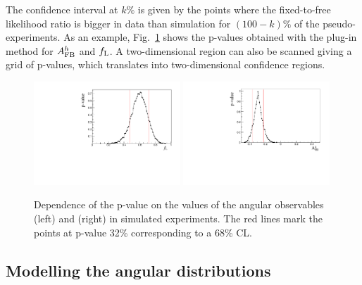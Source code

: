 The confidence interval at $k\%$ is given by the points where the fixed-to-free likelihood ratio is bigger in data than
simulation for $(100-k)\%$ of the pseudo-experiments. As an example, Fig.~\ref{fig:FCexample} shows the p-values obtained
with the plug-in method for $A_{\rm FB}^h$ and $f_{\rm L}$. A two-dimensional region 
can also be scanned giving a grid of p-values, which translates into two-dimensional confidence regions.
%
\begin{figure}[h!]
\centering
\includegraphics[width=0.49\textwidth]{Lmumu/figs/pvalue_fL_1500_2000.pdf}
\includegraphics[width=0.49\textwidth]{Lmumu/figs/pvalue_afbB_1500_2000.pdf}
\caption{ Dependence of the p-value on the values of the angular observables \fl (left) 
and \afbh (right) in simulated experiments. The red lines mark the points
at p-value 32\% corresponding to a 68\% CL.}
\label{fig:FCexample}
\end{figure}

\subsection{Modelling the angular distributions}
\label{sec:angfit}

